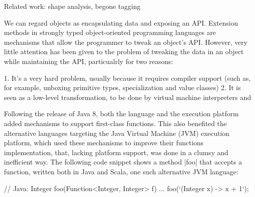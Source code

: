 Related work:
shape analysis, begone tagging












We can regard objects as encapsulating data and exposing an API. Extension methods in strongly typed object-oriented programming languages are mechanisms that allow the programmer to tweak an object's API. However, very little attention has been given to the problem of tweaking the data in an object while maintaining the API, particualrly for two reasons:

1. It's a very hard problem, usually because it requires compiler support (such as, for example, unboxing primitive types, specialization and value classes)
2. It is seen as a low-level transformation, to be done by virtual machine interpreters and





Following the release of Java 8, both the language and the execution platform added mechanisms to support first-class functions. This also benefited the alternative languages targeting the Java Virtual Machine (JVM) execution platform, which used these mechanisms to improve their functions implementation, that, lacking platform support, was done in a clumsy and inefficient way. The following code snippet shows a method |foo| that accepts a function, written both in Java and Scala, one such alternative JVM language:

\begin{lstlisting-nobreak}
// Java:
Integer foo(Function<Integer, Integer> f) { ... }
foo(`(Integer x) -> x + 1`);
\end{lstlisting-nobreak}

